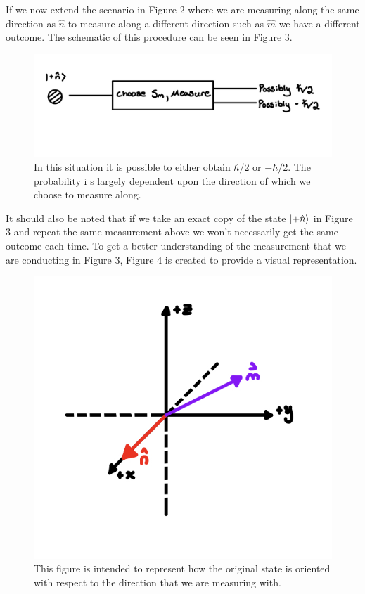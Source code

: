 \documentclass[twocolumn]{article}
\begin{document}
\newline
If we now extend the scenario in Figure 2 where we are measuring along the same direction as $\hat{n}$ to measure along a different direction such as $\hat{m}$ we have a different outcome. The schematic of this procedure can be seen in Figure 3.
\begin{figure}[htbp]
\begin{center}
\includegraphics[width=1.00\linewidth]{Spin-With-M-Direction.jpg}
\caption{In this situation it is possible to either obtain $\hbar/2$ or $-\hbar/2$. The probability i   s largely dependent upon the direction of which we choose to measure along.}
\end{center}
\end{figure}
\newpage
It should also be noted that if we take an exact copy of the state $\ket{+\hat{n}}$ in Figure 3 and repeat the same measurement above we won't necessarily get the same outcome each time. To get a better understanding of the measurement that we are conducting in Figure 3, Figure 4 is created to provide a visual representation.
\begin{figure}[htbp]
\begin{center}
\includegraphics[width=0.75\linewidth]{Spin-With-M-and-N-Graph.jpg}
\caption{This figure is intended to represent how the original state is oriented with respect to the direction that we are measuring with.}
\end{center}
\end{figure}
\end{document}
